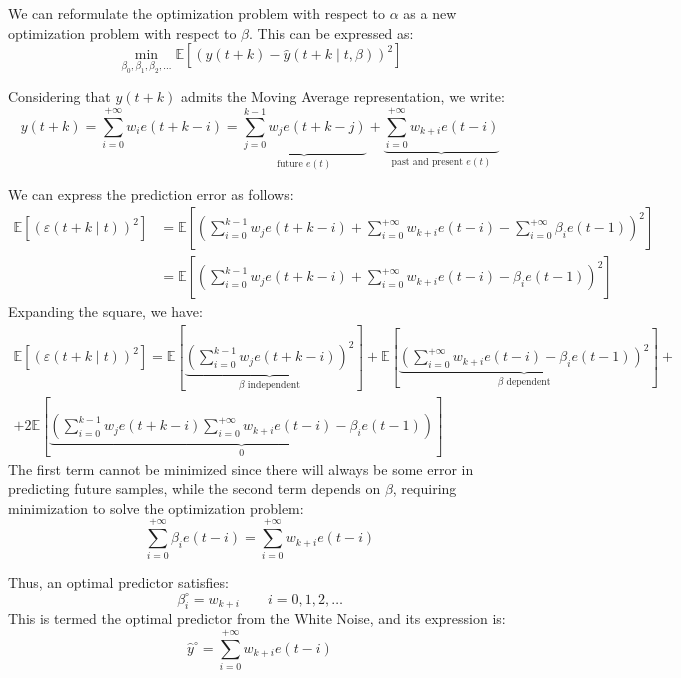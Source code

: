 We can reformulate the optimization problem with respect to $\alpha$ as a new optimization problem with respect to $\beta$. 
This can be expressed as:
\[\min_{\beta_0,\beta_1,\beta_2,\dots}\mathbb{E}\left[{\left( y(t+k)-\hat{y}(t+k\mid t,\beta) \right)}^2\right]\]

Considering that $y(t+k)$ admits the Moving Average representation, we write:
\[y(t+k)=\sum_{i=0}^{+\infty}w_i e(t+k-i)=\underbrace{\sum_{j=0}^{k-1}w_j e(t+k-j)}_{\text{future } e(t)} +\underbrace{\sum_{i=0}^{+\infty}w_{k+i}e(t-i)}_{\text{past and present } e(t)} \]

We can express the prediction error as follows:
\begin{align*}
    \mathbb{E}\left[ {\left(\varepsilon(t+k\mid t)\right)}^2 \right]  &= \mathbb{E}\left[ {\left(\sum_{i=0}^{k-1}w_j e(t+k-i)+\sum_{i=0}^{+\infty}w_{k+i}e(t-i)-\sum_{i=0}^{+\infty}\beta_i e(t-1)\right)}^2 \right] \\
                                                                &= \mathbb{E}\left[ {\left(\sum_{i=0}^{k-1}w_j e(t+k-i)+\sum_{i=0}^{+\infty}w_{k+i}e(t-i)-\beta_i e(t-1)\right)}^2 \right] 
\end{align*}
Expanding the square, we have:
\begin{multline*}
    \mathbb{E}\left[ {\left(\varepsilon(t+k\mid t)\right)}^2 \right] = \mathbb{E}\left[ \underbrace{{\left(\sum_{i=0}^{k-1}w_j e(t+k-i)\right)}^2}_{\beta \text{ independent}}\right]  +\mathbb{E}\left[\underbrace{{\left(\sum_{i=0}^{+\infty}w_{k+i}e(t-i)-\beta_i e(t-1)\right)}^2}_{\beta \text{ dependent}}\right]  +\\ +2\mathbb{E}\left[\underbrace{\left(\sum_{i=0}^{k-1}w_j e(t+k-i)\sum_{i=0}^{+\infty}w_{k+i}e(t-i)-\beta_i e(t-1)\right)}_0 \right]                       
\end{multline*}
The first term cannot be minimized since there will always be some error in predicting future samples, while the second term depends on $\beta$, requiring minimization to solve the optimization problem:
\[\sum_{i=0}^{+\infty}\beta_i e(t-i)=\sum_{i=0}^{+\infty}w_{k+i}e(t-i)\]

Thus, an optimal predictor satisfies:
\[\beta_i^\circ=w_{k+i} \qquad i=0,1,2,\dots\]
This is termed the optimal predictor from the  White Noise, and its expression is:
\[\hat{y}^\circ=\sum_{i=0}^{+\infty}w_{k+i}e(t-i)\]

